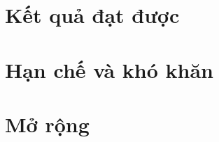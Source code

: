 \documentclass[./../main.tex]{subfiles}
\begin{document}
\section{Kết quả đạt được}
\section{Hạn chế và khó khăn}
\section{Mở rộng}
\end{document}
